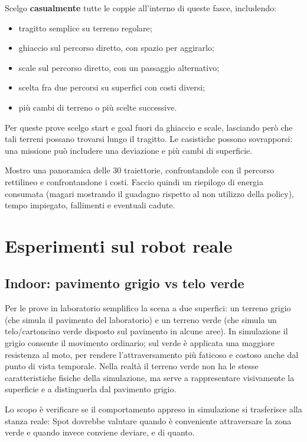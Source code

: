 \documentclass[11pt,a4paper]{article}
\begin{document}
Scelgo \textbf{casualmente} tutte le coppie all'interno di queste fasce, includendo:
\begin{itemize}
\item tragitto semplice su terreno regolare;
\item ghiaccio sul percorso diretto, con spazio per aggirarlo;
\item scale sul percorso diretto, con un passaggio alternativo;
\item scelta fra due percorsi su superfici con costi diversi;
\item più cambi di terreno o più scelte successive.
\end{itemize}

Per queste prove scelgo start e goal fuori da ghiaccio e scale, lasciando però che tali terreni possano trovarsi lungo il tragitto.
Le casistiche possono sovrapporsi: una missione può includere una deviazione e più cambi di superficie.

Mostro una panoramica delle 30 traiettorie, confrontandole con il percorso rettilineo e confrontandone i costi.
Faccio quindi un riepilogo di energia consumata (magari mostrando il guadagno rispetto al non utilizzo della policy), tempo impiegato, fallimenti e eventuali cadute.

\section{Esperimenti sul robot reale}

\subsection{Indoor: pavimento grigio vs telo verde}

Per le prove in laboratorio semplifico la scena a due superfici: un terreno grigio (che simula il pavimento del laboratorio) e un terreno verde (che simula un telo/cartoncino verde disposto sul pavimento in alcune aree).
In simulazione il grigio consente il movimento ordinario; sul verde è applicata una maggiore resistenza al moto, per rendere l'attraversamento più faticoso e costoso anche dal punto di vista temporale.
Nella realtà il terreno verde non ha le stesse caratteristiche fisiche della simulazione, ma serve a rappresentare visivamente la superficie e a distinguerla dal pavimento grigio.

Lo scopo è verificare se il comportamento appreso in simulazione si trasferisce alla stanza reale: Spot dovrebbe valutare quando è conveniente attraversare la zona verde e quando invece conviene deviare, e di quanto.
\end{document}
